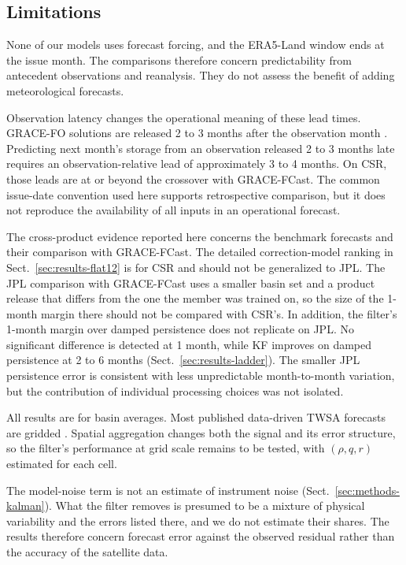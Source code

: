 \documentclass[hess, manuscript]{copernicus}
\begin{document}
\subsection{Limitations}
\label{sec:disc-limitations}

None of our models uses forecast forcing, and the ERA5-Land window ends at the
issue month. The comparisons therefore concern predictability from
antecedent observations and reanalysis. They do not assess the benefit of
adding meteorological forecasts.

Observation latency changes the operational meaning of these lead times. GRACE-FO
solutions are released 2 to 3 months after the observation month
\citep{mo2025nrt, li2026fcast}. Predicting next month's storage from an
observation released 2 to 3 months late requires an observation-relative lead
of approximately 3 to 4 months. On CSR, those leads are at or beyond the
crossover with GRACE-FCast. The common issue-date convention used here
supports retrospective comparison, but it does not reproduce the
availability of all inputs in an operational forecast.

The cross-product evidence reported here concerns the benchmark forecasts
and their comparison with GRACE-FCast. The detailed correction-model
ranking in Sect.~\ref{sec:results-flat12} is for CSR and should not be
generalized to JPL. The JPL comparison with GRACE-FCast uses a smaller
basin set and a product release that differs from the one the member was
trained on, so the size of the 1-month margin there should not be
compared with CSR's.
In addition, the filter's 1-month margin over damped persistence does not
replicate on JPL. No significant difference is detected at 1 month,
while KF improves on damped persistence at 2 to 6 months
(Sect.~\ref{sec:results-ladder}). The smaller JPL persistence error is
consistent with less unpredictable month-to-month variation, but the
contribution of individual processing choices was not isolated.

All results are for basin averages. Most published data-driven TWSA
forecasts are gridded \citep{li2020wrr, li2024grl, li2026fcast}. Spatial
aggregation changes both the signal and its error structure, so the
filter's performance at grid scale remains to be tested, with
$(\rho, q, r)$ estimated for each cell.

The model-noise term is not an estimate of instrument noise
(Sect.~\ref{sec:methods-kalman}). What the filter removes is presumed to
be a mixture of physical variability and the errors listed there, and we
do not estimate their shares. The results therefore concern forecast
error against the observed residual rather than the accuracy of the
satellite data.
\end{document}
